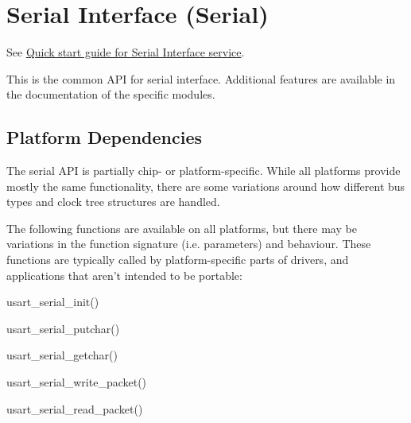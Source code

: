 \hypertarget{group__serial__group}{}\section{Serial Interface (Serial)}
\label{group__serial__group}
See \hyperlink{serial_quickstart}{Quick start guide for Serial Interface service}.

This is the common A\+P\+I for serial interface. Additional features are available in the documentation of the specific modules.\hypertarget{group__serial__group_serial_group_platform}{}\subsection{Platform Dependencies}\label{group__serial__group_serial_group_platform}
The serial A\+P\+I is partially chip-\/ or platform-\/specific. While all platforms provide mostly the same functionality, there are some variations around how different bus types and clock tree structures are handled.

The following functions are available on all platforms, but there may be variations in the function signature (i.\+e. parameters) and behaviour. These functions are typically called by platform-\/specific parts of drivers, and applications that aren't intended to be portable\+:
\begin{DoxyItemize}
\item usart\+\_\+serial\+\_\+init()
\item usart\+\_\+serial\+\_\+putchar()
\item usart\+\_\+serial\+\_\+getchar()
\item usart\+\_\+serial\+\_\+write\+\_\+packet()
\item usart\+\_\+serial\+\_\+read\+\_\+packet() 
\end{DoxyItemize}